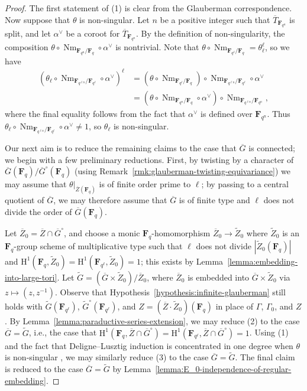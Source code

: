 \documentclass[reqno]{amsart}
\numberwithin{equation}{subsection}
\newcommand{\F}{\mathbf{F}}
\newcommand{\wt}[1]{\widetilde{#1}}
\newcommand{\ol}[1]{\overline{#1}}
\DeclareMathOperator{\Nm}{Nm}
\newcommand{\rH}{\ensuremath{\mathrm{H}}\xspace}
\theoremstyle{remark}
\numberwithin{equation}{subsection}
\numberwithin{figure}{subsection}
\begin{document}
\begin{proof}
    The first statement of (1) is clear from the Glauberman correspondence. Now suppose that $\theta$ is non-singular. Let $n$ be a positive integer such that $\ol T_{\F_{q^n}}$ is split, and let $\alpha^\vee$ be a coroot for $\ol T_{\F_{q^n}}$. By the definition of non-singularity, the composition $\theta \circ \Nm_{\F_{q^n}/\F_q} \circ \alpha^\vee$ is nontrivial. Note that $\theta \circ \Nm_{\F_{q^\ell}/\F_q} = \theta_\ell^\ell$, so we have
    \begin{align*}
    (\theta_\ell \circ \Nm_{\F_{q^{\ell n}}/\F_{q^\ell}} \circ \alpha^\vee)^\ell &= (\theta \circ \Nm_{\F_{q^\ell}/\F_q}) \circ \Nm_{\F_{q^{\ell n}}/\F_{q^\ell}} \circ \alpha^\vee \\
        &= (\theta \circ \Nm_{\F_{q^n}/\F_q} \circ \alpha^\vee) \circ \Nm_{\F_{q^{\ell n}}/\F_{q^n}},
    \end{align*}
    where the final equality follows from the fact that $\alpha^\vee$ is defined over $\F_{q^n}$. Thus $\theta_\ell \circ \Nm_{\F_{q^{\ell n}}/\F_{q^\ell}} \circ \alpha^\vee \neq 1$, so $\theta_\ell$ is non-singular.

    Our next aim is to reduce the remaining claims to the case that $\ol G$ is connected; we begin with a few preliminary reductions. First, by twisting by a character of $\ol G(\F_q)/\ol G^\circ(\F_q)$ (using Remark~\ref{rmk:glauberman-twisting-equivariance}) we may assume that $\theta|_{\ol Z(\F_q)}$ is of finite order prime to $\ell$; by passing to a central quotient of $\ol G$, we may therefore assume that $\ol G$ is of finite type and $\ell$ does not divide the order of $\ol G(\F_q)$.

    Let $\ol Z_0 = \ol Z \cap \ol G^\circ$, and choose a monic $\F_q$-homomorphism $\ol Z_0 \to \wt Z_0$ where $\wt Z_0$ is an $\F_q$-group scheme of multiplicative type such that $\ell$ does not divide $|\wt Z_0(\F_q)|$ and $\rH^1(\F_q, \wt Z_0) = \rH^1(\F_{q^\ell}, \wt Z_0) = 1$; this exists by Lemma~\ref{lemma:embedding-into-large-tori}. Let $\wt G = (\ol G \times \wt Z_0)/\ol Z_0$, where $\ol Z_0$ is embedded into $\ol G \times \wt Z_0$ via $z \mapsto (z, z^{-1})$. Observe that Hypothesis~\ref{hypothesis:infinite-glauberman} still holds with $\wt G(\F_{q^\ell})$, $\wt G^\circ(\F_{q^\ell})$, and $Z = (\ol Z \cdot \wt Z_0)(\F_q)$ in place of $\Gamma$, $\Gamma_0$, and $Z$. By Lemma~\ref{lemma:paraductive-series-extension}, we may reduce (2) to the case $\ol G = \wt G$, i.e., the case that $\rH^1(\F_q, \ol Z \cap \ol G^\circ) = \rH^1(\F_{q^\ell}, \ol Z \cap \ol G^\circ) = 1$. Using (1) and the fact that Deligne--Lusztig induction is concentrated in one degree when $\theta$ is non-singular \cite[Proposition~7.4]{DL76}, we may similarly reduce (3) to the case $\ol G = \wt G$. The final claim is reduced to the case $\ol G = \wt G$ by Lemma~\ref{lemma:E_0-independence-of-regular-embedding}.


\end{proof}
\end{document}
